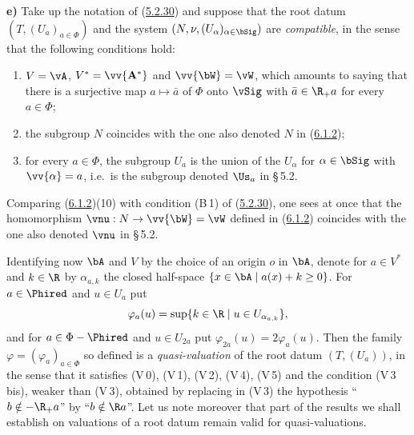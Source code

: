 \documentclass[12pt,a4paper,oneside,english]{smfart}
\newcommand{\btref}[1]{\hyperlink{bt:#1}{#1}}
\theoremstyle{definition}
\theoremstyle{bt}
\begin{document}
\medskip
\noindent\textbf{e)} Take up the notation of (\btref{5.2.30}) and suppose that the root
datum $(T,(U_a)_{a\in\Phi})$ and the system $(N,\nu,(U_\alpha)_{\alpha\in\bSig})$
are \emph{compatible}, in the sense that the following conditions hold:
\begin{enumerate}
\item[(i)] $V=\vA$, $V^{*}=\vv{\mathbf{A}^{*}}$ and $\vv{\bW}=\vW$, which amounts
to saying that there is a surjective map $a\mapsto\bar a$ of $\Phi$ onto $\vSig$
with $\bar a\in\R_{+}a$ for every $a\in\Phi$;
\item[(ii)] the subgroup $N$ coincides with the one also denoted $N$ in (\btref{6.1.2});
\item[(iii)] for every $a\in\Phi$, the subgroup $U_a$ is the union of the
$U_\alpha$ for $\alpha\in\bSig$ with $\vv{\alpha}=a$, i.e.\ is the subgroup
denoted $\Us_a$ in \S\,5.2.
\end{enumerate}
Comparing (\btref{6.1.2})(10) with condition (B\,1) of (\btref{5.2.30}), one sees at once that the
homomorphism $\vnu:N\to\vv{\bW}=\vW$ defined in (\btref{6.1.2}) coincides with the one
also denoted $\vnu$ in \S\,5.2.

Identifying now $\bA$ and $V$ by the choice of an origin $o$ in $\bA$, denote for
$a\in V^{*}$ and $k\in\R$ by $\alpha_{a,k}$ the closed half-space
$\{x\in\bA\mid a(x)+k\ge 0\}$. For $a\in\Phired$ and $u\in U_a$ put
\[ \varphi_a(u)=\sup\{k\in\R\mid u\in U_{\alpha_{a,k}}\}, \]
and for $a\in\Phi-\Phired$ and $u\in U_{2a}$ put $\varphi_{2a}(u)=2\varphi_a(u)$.
Then the family $\varphi=(\varphi_a)_{a\in\Phi}$ so defined is a
\emph{quasi-valuation} of the root datum $(T,(U_a))$, in the sense that it
satisfies (V\,0), (V\,1), (V\,2), (V\,4), (V\,5) and the condition (V\,3 bis),
weaker than (V\,3), obtained by replacing in (V\,3) the hypothesis
``$b\notin-\R_{+}a$'' by ``$b\notin\R a$''. Let us note moreover that part of the
results we shall establish on valuations of a root datum remain valid for
quasi-valuations.
\end{document}
